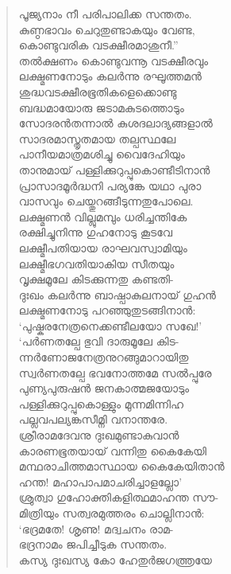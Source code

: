 \begin{verse}
പൂജ്യനാം നീ പരിപാലിക്ക സന്തതം.\\
കുണ്ഠഭാവം ചെറുതുണ്ടാകയും വേണ്ട,\\
കൊണ്ടുവരിക വടക്ഷീരമാശുനീ.”\\
തല്‍ക്ഷണം കൊണ്ടുവന്നൂ വടക്ഷീരവും\\
ലക്ഷ്മണനോടും കലര്‍ന്നു രഘൂത്തമന്‍\\
ശുദ്ധവടക്ഷീരഭൂതികളെക്കൊണ്ടു\\
ബദ്ധമായോരു ജടാമകുടത്തൊടും\\
സോദരന്‍തന്നാല്‍ കുശദലാദ്യങ്ങളാല്‍\\
സാദരമാസ്തൃതമായ തല്പസ്ഥലേ\\
പാനീയമാത്രമശിച്ചു വൈദേഹിയും\\
താനുമായ് പള്ളിക്കുറുപ്പുകൊണ്ടീടിനാന്‍\\
പ്രാസാദമൂര്‍ദ്ധനി പര്യങ്കേ യഥാ പുരാ\\
വാസവും ചെയ്തുറങ്ങീടുന്നതുപോലെ.\\
ലക്ഷ്മണന്‍ വില്ലുമമ്പും ധരിച്ചന്തികേ\\
രക്ഷിച്ചുനിന്നു ഗുഹനോടു കൂടവേ\\
ലക്ഷ്മീപതിയായ രാഘവസ്വാമിയും\\
ലക്ഷ്മീഭഗവതിയാകിയ സീതയും\\
വൃക്ഷമൂലേ കിടക്കുന്നതു കണ്ടതി-\\
ദുഃഖം കലര്‍ന്നു ബാഷ്പാകുലനായ് ഗുഹന്‍\\
ലക്ഷ്മണനോടു പറഞ്ഞുതുടങ്ങിനാന്‍:\\
‘പുഷ്കരനേത്രനെക്കണ്ടീലയോ സഖേ!’\\
‘പര്‍ണതല്പേ ഭുവി ദാരുമൂലേ കിട-\\
ന്നര്‍ണോജനേത്രനുറങ്ങുമാറായിതു\\
സ്വര്‍ണതല്പേ ഭവനോത്തമേ സല്‍പ്പുരേ\\
പുണ്യപുരുഷന്‍ ജനകാത്മജയോടും\\
പള്ളിക്കുറുപ്പുകൊള്ളും മുന്നമിന്നിഹ\\
പല്ലവപല്യങ്കസീമ്നി വനാന്തരേ.\\
ശ്രീരാമദേവനു ദുഃഖമുണ്ടാകുവാന്‍\\
കാരണഭൂതയായ് വന്നിതു കൈകേയി\\
മന്ഥരാചിത്തമാസ്ഥായ കൈകേയിതാന്‍\\
ഹന്ത! മഹാപാപമാചരിച്ചാളല്ലോ’\\
ശ്രുത്വാ ഗുഹോക്തികളിത്ഥമാഹന്ത സൗ-\\
മിത്രിയും സത്വരമുത്തരം ചൊല്ലിനാന്‍:\\
‘ഭദ്രമതേ! ശൃണു! മദ്വചനം രാമ-\\
ഭദ്രനാമം ജപിച്ചീടുക സന്തതം.\\
കസ്യ ദുഃഖസ്യ കോ ഹേതുര്‍ജഗത്ത്രയേ\\

\end{verse}
